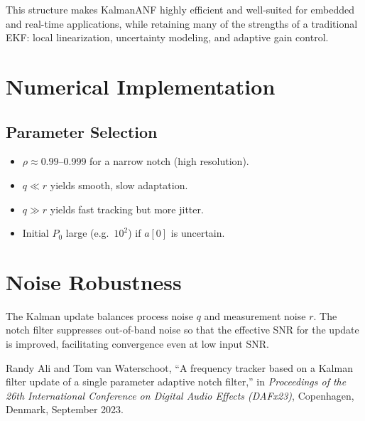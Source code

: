 \documentclass{article}
\begin{document}
This structure makes KalmanANF highly efficient and well-suited for embedded and real-time applications, while retaining many of the strengths of a traditional EKF: local linearization, uncertainty modeling, and adaptive gain control.

\section{Numerical Implementation}

\subsection{Parameter Selection}
\begin{itemize}
  \item \(\rho\approx0.99\)–0.999 for a narrow notch (high resolution).  
  \item \(q\ll r\) yields smooth, slow adaptation.  
  \item \(q\gg r\) yields fast tracking but more jitter.  
  \item Initial \(P_0\) large (e.g.\ \(10^2\)) if \(a[0]\) is uncertain.  
\end{itemize}


\section{Noise Robustness}

The Kalman update balances process noise \(q\) and measurement noise \(r\).  The notch filter suppresses out-of-band noise so that the effective SNR for the update is improved, facilitating convergence even at low input SNR.

\begin{thebibliography}{9}
Randy Ali and Tom van Waterschoot,  
``A frequency tracker based on a Kalman filter update of a single parameter adaptive notch filter,''  
in \emph{Proceedings of the 26th International Conference on Digital Audio Effects (DAFx23)},  
Copenhagen, Denmark, September 2023.
\end{thebibliography}
\end{document}
